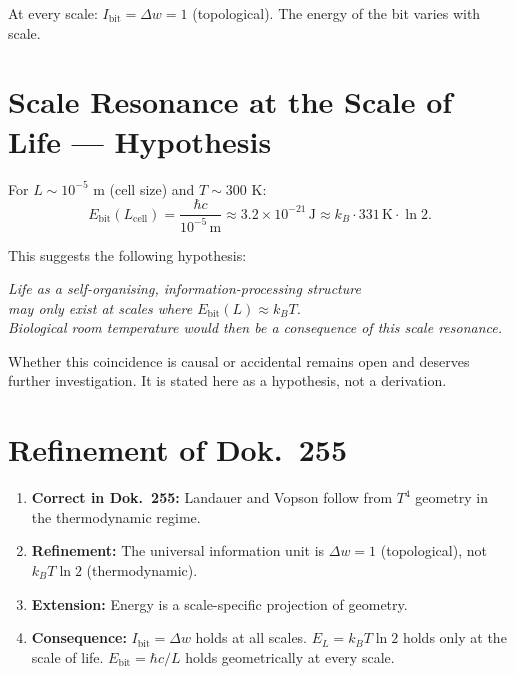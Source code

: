 At every scale: \(I_\text{bit} = \Delta w = 1\) (topological).
The energy of the bit varies with scale.

\section{Scale Resonance at the Scale of Life — Hypothesis}

For \(L \sim 10^{-5}\) m (cell size) and \(T \sim 300\) K:
\begin{equation}
  E_\text{bit}(L_\text{cell}) = \frac{\hbar c}{10^{-5}\,\text{m}}
  \approx 3.2 \times 10^{-21}\,\text{J}
  \approx k_B \cdot 331\,\text{K} \cdot \ln 2.
\end{equation}

This suggests the following hypothesis:

\begin{center}
\textit{Life as a self-organising, information-processing structure\\
may only exist at scales where \(E_\text{bit}(L) \approx k_BT\).\\
Biological room temperature would then be a consequence of this scale resonance.}
\end{center}

Whether this coincidence is causal or accidental remains open
and deserves further investigation.
It is stated here as a hypothesis, not a derivation.

\section{Refinement of Dok.~255}

\begin{enumerate}
  \item \textbf{Correct in Dok.~255:}
        Landauer and Vopson follow from \(T^4\) geometry
        in the thermodynamic regime.
  \item \textbf{Refinement:}
        The universal information unit is \(\Delta w = 1\)
        (topological), not \(k_BT\ln2\) (thermodynamic).
  \item \textbf{Extension:}
        Energy is a scale-specific projection of geometry.
  \item \textbf{Consequence:}
        \(I_\text{bit} = \Delta w\) holds at all scales.
        \(E_L = k_BT\ln2\) holds only at the scale of life.
        \(E_\text{bit} = \hbar c/L\) holds geometrically at every scale.
\end{enumerate}

